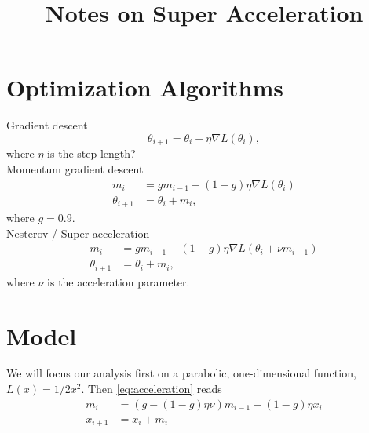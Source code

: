 \documentclass[12pt,a4paper]{article}
\begin{document}
\title{ Notes on Super Acceleration }

\author[$\dagger$]{}
\date{}

\maketitle


\section{Optimization Algorithms}

Gradient descent
\begin{equation}
	\theta_{i+1} = \theta_i - \eta \nabla L(\theta_i),
\end{equation}
where $\eta$ is the step length? \\

Momentum gradient descent
\begin{align}
	m_i &= g m_{i-1} - (1-g) \eta \nabla L(\theta_i) \\
	\theta_{i+1} &= \theta_i + m_i,
\end{align}
where $g=0.9$. \\

Nesterov / Super acceleration
\begin{align}\label{eq:acceleration}
	m_i &= gm_{i-1} - (1-g)\eta \nabla L(\theta_i + \nu m_{i-1}) \\
	\theta_{i+1} &= \theta_i + m_i,
\end{align}
where $\nu$ is the acceleration parameter. 


\section{Model}
We will focus our analysis first on a parabolic, one-dimensional function, $L(x) = 1/2 x^2$. Then \ref{eq:acceleration} reads
\begin{align}
	m_i &= (g-(1-g)\eta \nu) m_{i-1} - (1-g)\eta x_i \\
	x_{i+1} &= x_i + m_i
\end{align}
\end{document}

